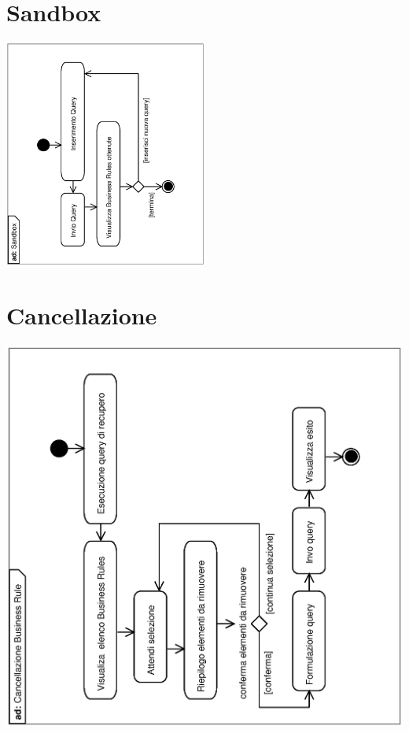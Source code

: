 \documentclass[11pt,titlepage,a4paper]{report}
\begin{document}
\section{Sandbox}

\begin{center}
 \includegraphics[width=0.5\textwidth, angle=-90]{Sandbox.eps}
\end{center}


\section{Cancellazione \br}

\begin{center}
 \includegraphics[width=1\textwidth, angle=-90]{CancellazioneBusinessRule.eps}
\end{center}
\end{document}
